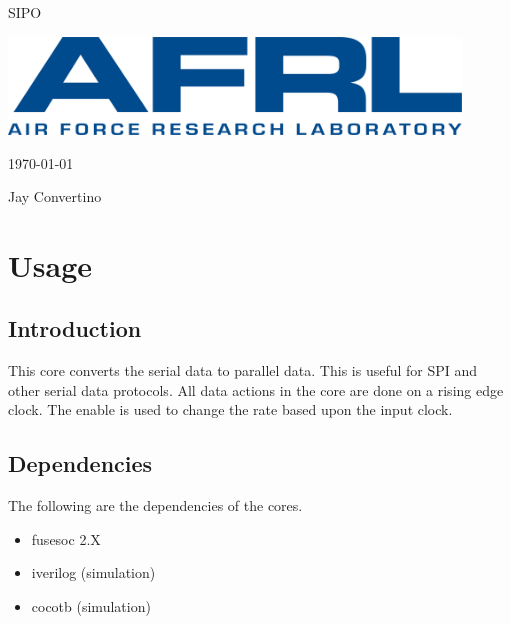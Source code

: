 \begin{titlepage}
  \begin{center}

  {\Huge SIPO}

  \vspace{25mm}

  \includegraphics[width=0.90\textwidth,height=\textheight,keepaspectratio]{img/AFRL.png}

  \vspace{25mm}

  \today

  \vspace{15mm}

  {\Large Jay Convertino}

  \end{center}
\end{titlepage}

\tableofcontents

\newpage

\section{Usage}

\subsection{Introduction}

\par
This core converts the serial data to parallel data. This is useful for SPI and other serial data protocols. All data actions
in the core are done on a rising edge clock. The enable is used to change the rate based upon the input clock.

\subsection{Dependencies}

\par
The following are the dependencies of the cores.

\begin{itemize}
  \item fusesoc 2.X
  \item iverilog (simulation)
  \item cocotb (simulation)
\end{itemize}

